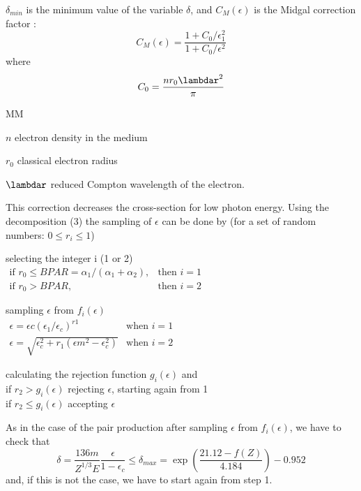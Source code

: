 \begin{bibunit}[unsrt]
\begin{flushleft}
\end{flushleft}
$\delta_{min}$ is the minimum value of the variable $\delta$, and
$C_M(\epsilon)$  is the Midgal correction factor \cite{bib-MIGD}:
\[
C_M (\epsilon)  =\frac{1 + C_0 / \epsilon_1^2}
               {1 + C_0 / \epsilon^2} 
\]
 where
\[
C_0 =\frac{nr_0 \lambdar^2 }{\pi}
\]
\begin{DL}{MM}
\item[$n$]           electron density in the medium
\item[$r_0$]         classical electron radius
\item[$\lambdar$]    reduced Compton wavelength of the electron.
\end{DL}
This correction decreases the cross-section for low photon energy.
Using the decomposition (3) the sampling of $\epsilon$ can be done by
(for a set of random numbers: $0\leq r_i\leq 1$)
\begin{OL}
\item  selecting the integer i (1 or 2)\\
$ \begin{array}{ll}
\mbox{if  }r_0 \leq BPAR = \alpha_1/(\alpha_1+\alpha_2), & \mbox{then  } i=1 \\
\mbox{if  } r_0 > BPAR,                                  & \mbox{then  } i=2
\end{array}$
\item
sampling $\epsilon$ from $f_i(\epsilon) $ \\
$\begin{array}{ll}
\epsilon =\epsilon c(\epsilon_1/\epsilon_c)^{r1} & \mbox{when  } i=1 \\
\epsilon  =\sqrt{\epsilon_c^2 + r_1 (\epsilon m^2-\epsilon_c^2)} 
                                                 & \mbox{when  } i=2 
\end{array}$
\item
calculating the rejection function $g_i(\epsilon)$ and\\
if $ r_2>g_i(\epsilon)$  rejecting $\epsilon$, starting again from 1\\
if $ r_2\leq g_i(\epsilon)$ accepting $\epsilon$
\end{OL}
As in the case of the pair production after sampling $\epsilon$ from
$f_i(\epsilon)$,
we have to check that
\[
\delta  = \frac{136 m} {Z^{1/3}E} \frac{\epsilon} {1 - \epsilon_c}
       \leq \delta_{max}=
       \exp  \left(\frac{21.12-f(Z)} {4.184}\right)  - 0.952
\]
and, if this is not the case, we have to start again from step 1.
 

\end{bibunit}
